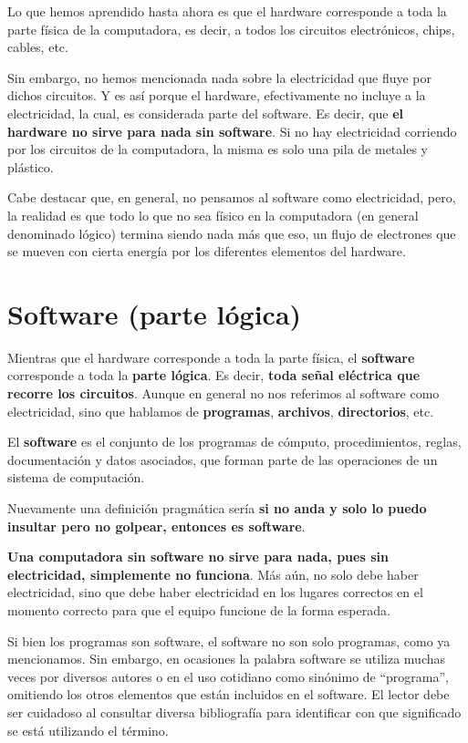 Lo que hemos aprendido hasta ahora es que el hardware corresponde a toda la
parte física de la computadora, es decir, a todos los circuitos electrónicos,
chips, cables, etc.

Sin embargo, no hemos mencionada nada sobre la electricidad que fluye por dichos
circuitos. Y es así porque el hardware, efectivamente no incluye a la
electricidad, la cual, es considerada parte del software. Es decir, que
\textbf{el hardware no sirve para nada sin software}. Si no hay electricidad
corriendo por los circuitos de la computadora, la misma es solo una pila de
metales y plástico.

Cabe destacar que, en general, no pensamos al software como electricidad, pero,
la realidad es que todo lo que no sea físico en la computadora (en general
denominado lógico) termina siendo nada más que eso, un flujo de electrones que
se mueven con cierta energía por los diferentes elementos del hardware.

\section{Software (parte lógica)}
\label{chap:computadoras:sec:software}

Mientras que el hardware corresponde a toda la parte física, el
\textbf{software} corresponde a toda la \textbf{parte lógica}. Es decir,
\textbf{toda señal eléctrica que recorre los circuitos}. Aunque en general no
nos referimos al software como electricidad, sino que hablamos de
\textbf{programas}, \textbf{archivos}, \textbf{directorios}, etc.

\begin{definition} El \textbf{software} es el conjunto de los
    programas de cómputo, procedimientos, reglas, documentación y datos
    asociados, que forman parte de las operaciones de un sistema de
    computación.\autocite[vid. p.13]{gookin_2005}
\end{definition}

Nuevamente una definición pragmática sería \textbf{si no anda y solo lo puedo
insultar pero no golpear, entonces es software}.

\textbf{Una computadora sin software no sirve para nada, pues sin electricidad,
simplemente no funciona}. Más aún, no solo debe haber electricidad, sino que
debe haber electricidad en los lugares correctos en el momento correcto para que
el equipo funcione de la forma esperada.

Si bien los programas son software, el software no son solo programas, como ya
mencionamos. Sin embargo, en ocasiones la palabra software se utiliza muchas
veces por diversos autores o en el uso cotidiano como sinónimo de ``programa'',
omitiendo los otros elementos que están incluidos en el software. El lector debe
ser cuidadoso al consultar diversa bibliografía para identificar con que
significado se está utilizando el término.


